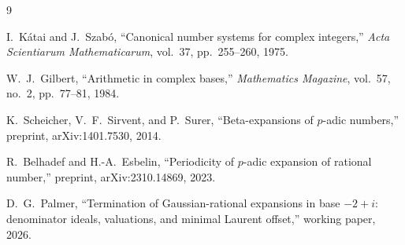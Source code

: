 \documentclass[11pt]{article}
\theoremstyle{definition}
\begin{document}
\begin{thebibliography}{9}

I.~K\'atai and J.~Szab\'o,
``Canonical number systems for complex integers,''
\emph{Acta Scientiarum Mathematicarum}, vol.~37, pp.~255--260, 1975.

W.~J.~Gilbert,
``Arithmetic in complex bases,''
\emph{Mathematics Magazine}, vol.~57, no.~2, pp.~77--81, 1984.

K.~Scheicher, V.~F.~Sirvent, and P.~Surer,
``Beta-expansions of $p$-adic numbers,''
preprint, arXiv:1401.7530, 2014.

R.~Belhadef and H.-A.~Esbelin,
``Periodicity of $p$-adic expansion of rational number,''
preprint, arXiv:2310.14869, 2023.

D.~G.~Palmer,
``Termination of Gaussian-rational expansions in base $-2+i$: denominator ideals, valuations, and minimal Laurent offset,''
working paper, 2026.

\end{thebibliography}
\end{document}
